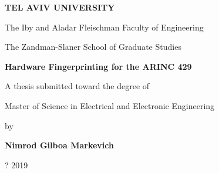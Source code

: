 \begin{titlepage}
\begin{center}
  \vspace*{1cm}
  
  \large
  \textbf{TEL AVIV UNIVERSITY}
  
  \normalsize
  The Iby and Aladar Fleischman Faculty of Engineering
  
  The Zandman-Slaner School of Graduate Studies
  
  \vspace{0.5cm}
  \Large
  \textbf{Hardware Fingerprinting for the ARINC 429}
  
  \vspace{0.5cm}
  
  \vspace{1cm}
  \normalsize
   A thesis submitted toward the degree of
   
   Master of Science in Electrical and Electronic Engineering
   
   \vspace{0.5cm}
   by
   
  \Large
  \textbf{Nimrod Gilboa Markevich}
  
  \vspace{0.5cm}
  \large
  ? 2019
\end{center}
\end{titlepage}
